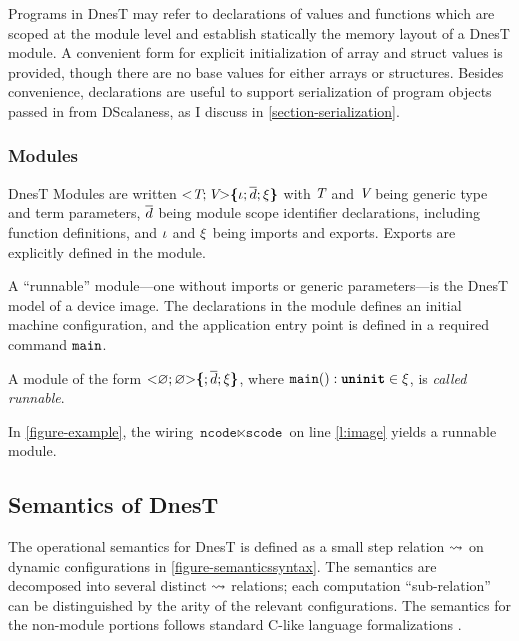 Programs in DnesT may refer to declarations of values and functions which are scoped at the
module level and establish statically the memory layout of a DnesT module. A convenient form for
explicit initialization of array and struct values is provided, though there are no base values
for either arrays or structures. Besides convenience, declarations are useful to support
serialization of program objects passed in from DScalaness, as I discuss in
\autoref{section-serialization}.

\subsubsection{Modules}

DnesT Modules are written $\margs{\tpdecl; \vpdecl}\lc \imports; \decls \exports \rc$ with
$\tpdecl$ and $\vpdecl$ being generic type and term parameters, $\vect{d}$ being module scope
identifier declarations, including function definitions, and $\imports$ and $\exports$ being
imports and exports. Exports are explicitly defined in the module.

A ``runnable'' module---one without imports or generic parameters---is the DnesT model of a
device image. The declarations in the module defines an initial machine configuration, and the
application entry point is defined in a required command $\tt{main}$.
\begin{definition}
\label{def-runnable-syntax}
A module of the form $\margs{\varnothing; \varnothing }\lc ; \vect{\decl}; \exports\rc$, where
$\tt{main}() : \undefv \in \exports$, is \emph{called runnable}.
\end{definition}
In \autoref{figure-example}, the wiring $\texttt{ncode} \ltimes \texttt{scode}$ on line
\ref{l:image} yields a runnable module.

\subsection{Semantics of DnesT} 
\label{section-nestsemantics}

The operational semantics for DnesT is defined as a small step relation $\compute$ on dynamic
configurations in \autoref{figure-semanticssyntax}. The semantics are decomposed into several
distinct $\compute$ relations; each computation ``sub-relation'' can be distinguished by the
arity of the relevant configurations. The semantics for the non-module portions follows standard
C-like language formalizations \cite{Leroy-compcert-06,grossman03}.

